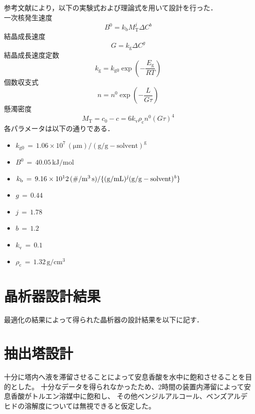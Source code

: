 \documentclass[a4j]{jsreport}
\begin{document}
参考文献\cite{晶析}により，以下の実験式および理論式を用いて設計を行った．\\
一次核発生速度
\begin{equation}
    B^0 = k_{\mathrm{ b}}M_{\mathrm{ T}}^j \Delta C^b
\end{equation}
結晶成長速度
\begin{equation}
    G = k_{\mathrm{ g}}\Delta C^g
\end{equation}
結晶成長速度定数
\begin{equation}
    k_{\mathrm{ g}} = k_{\mathrm{ g0}} \exp(-\frac{E_{\mathrm{ g}}}{RT})
\end{equation}
個数収支式
\begin{equation}
    n=n^0 \exp(-\frac{L}{G\tau})
\end{equation}
懸濁密度
\begin{equation}
    M_{\mathrm{ T}} = c_0-c = 6k_{\mathrm{ v}}\rho_{\mathrm{ c}}n^0(G\tau)^4
\end{equation}
各パラメータは以下の通りである．
\begin{itemize}
    \item[] $k_{\mathrm{ g0}}\,=\,1.06\times10^7\,\mathrm{ (\mu m)/(g/g-solvent)^g}$
    \item[] $B^{\mathrm{ 0}}\,=\,40.05\,\mathrm{ kJ/mol}$
    \item[] $k_{\mathrm{ b}}\,=\,9.16\times10^12\,\mathrm{ (\#/ m^3\,s)/\{(g/mL)^{{\it j}}(g/g-solvent)^{{\it b}}\}}$
    \item[] $g\,=\,0.44\,$
    \item[] $j\,=\,1.78\,$
    \item[] $b\,=\,1.2\,$
    \item[] $k_{\mathrm{ v}}\,=\,0.1\,$
    \item[] $\rho_{\mathrm{ c}}\,=\,1.32\,\mathrm{ g/cm^3}$
\end{itemize}

\section{晶析器設計結果}
最適化の結果によって得られた晶析器の設計結果を以下に記す．

\section{抽出塔設計}
十分に塔内へ液を滞留させることによって安息香酸を水中に飽和させることを目的とした。
十分なデータを得られなかったため、2時間の装置内滞留によって安息香酸がトルエン溶媒中に飽和し、
その他ベンジルアルコール、ベンズアルデヒドの溶解度については無視できると仮定した。
\end{document}
